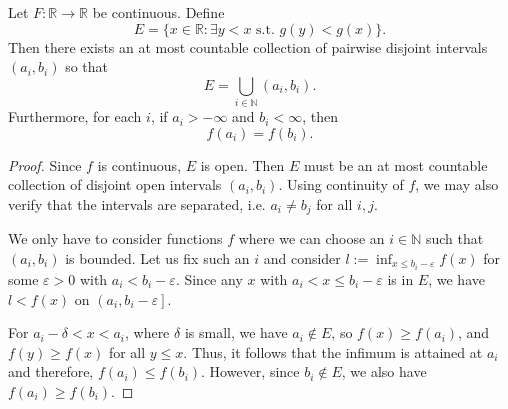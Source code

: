 
\begin{lemma}
	Let $F: \mathbb{R} \to  \mathbb{R}$ be continuous. Define
	\[
		E = \{x \in \mathbb{R}: \exists y < x \text{ s.t. } g(y) < g(x)\} 
	.\] 
	Then there exists an at most countable collection of pairwise disjoint intervals $(a_i, b_i)$ so that
	 \[
		E = \bigcup_{i \in \mathbb{N}} (a_i, b_i)
	.\] 
	Furthermore, for each $i$, if $a_i > - \infty $ and $b_i < \infty $, then
	\[
		f(a_i)= f(b_i)
	.\] 
\end{lemma}
\begin{proof}
	Since $f$ is continuous, $E$ is open. Then $E$ must be an at most countable collection of disjoint open intervals $(a_i, b_i)$.
	Using continuity of $f$, we may also verify that the intervals are separated, i.e. $a_i \neq  b_j$ for all $i, j$.

	We only have to consider functions  $f$ where we can choose an $i \in \mathbb{N}$ such that $\left(a_i, b_i\right)$ is bounded. Let us fix such an $i$ and consider $l:=\inf _{x \leq b_i-\varepsilon} f(x)$ for some $\varepsilon>0$ with $a_i<b_i-\varepsilon$. 
	Since any $x$ with $a_i<x \leq b_i-\varepsilon$ is in $E$, we have $l < f(x)$ on $\left(a_i, b_i-\varepsilon\right]$. 

	For $a_i - \delta < x<a_i$, where $\delta$ is small, we have $a_i \notin E$, so $f(x) \geq f\left(a_i\right)$, and $f(y) \ge f(x)$ for all $y \le x$. Thus, it follows that the infimum is attained at $a_i$ and therefore, $f\left(a_i\right) \leq f\left(b_i\right)$. However, since $b_i \notin E$, we also have $f\left(a_i\right) \geq f\left(b_i\right)$.
\end{proof}

